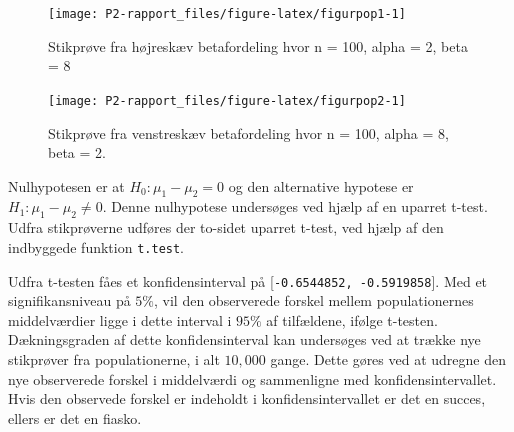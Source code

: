 \documentclass[
]{book}
\newenvironment{Shaded}{\begin{snugshade}}{\end{snugshade}}
\newcommand{\CommentTok}[1]{\textcolor[rgb]{0.56,0.35,0.01}{\textit{#1}}}
\newcommand{\DataTypeTok}[1]{\textcolor[rgb]{0.13,0.29,0.53}{#1}}
\newcommand{\DecValTok}[1]{\textcolor[rgb]{0.00,0.00,0.81}{#1}}
\newcommand{\FloatTok}[1]{\textcolor[rgb]{0.00,0.00,0.81}{#1}}
\newcommand{\KeywordTok}[1]{\textcolor[rgb]{0.13,0.29,0.53}{\textbf{#1}}}
\newcommand{\NormalTok}[1]{#1}
\newcommand{\OperatorTok}[1]{\textcolor[rgb]{0.81,0.36,0.00}{\textbf{#1}}}
\newcommand{\StringTok}[1]{\textcolor[rgb]{0.31,0.60,0.02}{#1}}
\theoremstyle{definition}
\theoremstyle{definition}
\theoremstyle{definition}
\theoremstyle{remark}
\begin{document}
\begin{figure}

{\centering \texttt{[image: P2-rapport\_files/figure-latex/figurpop1-1]} 

}

\caption{Stikprøve fra højreskæv betafordeling hvor n = 100, alpha = 2, beta = 8}\label{fig:figurpop1}
\end{figure}

\begin{figure}

{\centering \texttt{[image: P2-rapport\_files/figure-latex/figurpop2-1]} 

}

\caption{Stikprøve fra venstreskæv betafordeling hvor n = 100, alpha = 8, beta = 2.}\label{fig:figurpop2}
\end{figure}

Nulhypotesen er at \(H_0: \mu_1 - \mu_2 = 0\) og den alternative hypotese er \(H_1 : \mu_1 - \mu_2 \neq 0\). Denne nulhypotese undersøges ved hjælp af en uparret t-test. Udfra stikprøverne udføres der to-sidet uparret t-test, ved hjælp af den indbyggede funktion \texttt{t.test}.

\begin{Shaded}
\end{Shaded}

Udfra t-testen fåes et konfidensinterval på {[}\texttt{-0.6544852,\ -0.5919858}{]}. Med et signifikansniveau på \(5\%\), vil den observerede forskel mellem populationernes middelværdier ligge i dette interval i \(95\%\) af tilfældene, ifølge t-testen. Dækningsgraden af dette konfidensinterval kan undersøges ved at trække nye stikprøver fra populationerne, i alt \(10,000\) gange. Dette gøres ved at udregne den nye observerede forskel i middelværdi og sammenligne med konfidensintervallet. Hvis den observede forskel er indeholdt i konfidensintervallet er det en succes, ellers er det en fiasko.
\end{document}
